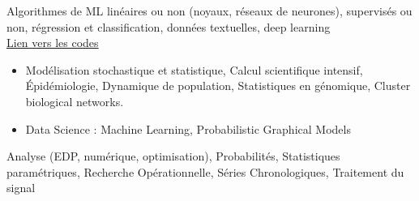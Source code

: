 


Algorithmes de ML linéaires ou non (noyaux, réseaux de neurones), supervisés ou non, régression et classification, données textuelles, deep learning\\
{\color{heading} \href{https://github.com/ClaireGayral/formation_openclassroom}{Lien vers les codes} 
}

\medskip

\begin{itemize}
\item 
    Modélisation stochastique et statistique, 
    Calcul scientifique intensif,
    \'Epidémiologie, 
    Dynamique de population,
    Statistiques en génomique, Cluster biological networks.
\item Data Science : Machine Learning, Probabilistic Graphical Models
\end{itemize}
\medskip

    Analyse (EDP, numérique, optimisation), Probabilités, Statistiques paramétriques, Recherche Opérationnelle, Séries Chronologiques, Traitement du signal
\medskip

\medskip




% 
% 
%   

